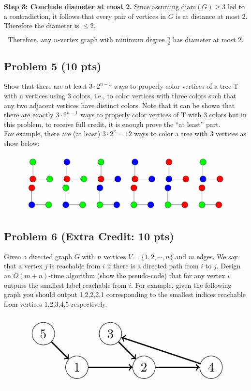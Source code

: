 \documentclass[12pt]{article}
\begin{document}
\bigskip
\textbf{Step 3: Conclude diameter at most 2.}
Since assuming \(\mathrm{diam}(G)\ge3\) led to a contradiction, it follows that every pair of vertices in \(G\) is at distance at most 2. Therefore the diameter is \(\le2\).

\[
\boxed{\text{Therefore, any }n\text{-vertex graph with minimum degree }\tfrac{n}{2}
\text{ has diameter at most }2.}
\]

\subsection*{Problem 5 (10 pts)}
Show that there are at least $3\cdot2^{n-1}$ ways to properly color vertices of a tree T with n vertices using 3 colors, i.e., to color vertices with three colors such that any two adjacent vertices have  distinct colors. Note that it can be shown that there are exactly $3\cdot2^{n-1}$ ways to properly color vertices of T with 3 colors but in this problem, to receive full credit, it is enough prove the “at least” part.\\
For example, there are (at least) $3\cdot2^2 = 12$ ways to color a tree with 3 vertices as show below:

\begin{figure}[H]
    \centering
    \includegraphics[width=0.8\linewidth]{P5.png}
    \label{fig:3-color-graph}
\end{figure}

\subsection*{Problem 6 (Extra Credit: 10 pts)}
Given a directed graph $G$ with $n$ vertices $V = \{1,2,\cdots,n\}$ and $m$ edges. We say that a vertex $j$ is reachable from $i$ if there is a directed path from $i$ to $j$. Design an $O(m+n)$-time algorithm (show the pseudo-code) that for any vertex $i$ outputs the smallest label reachable from $i$. For example, given the following graph you should output 1,2,2,2,1 corresponding to the smallest indices reachable from vertices 1,2,3,4,5 respectively.
\begin{figure}[H]
    \centering
    \includegraphics[width=0.5\linewidth]{P6.png}
    \label{fig:P6}
\end{figure}
\end{document}
